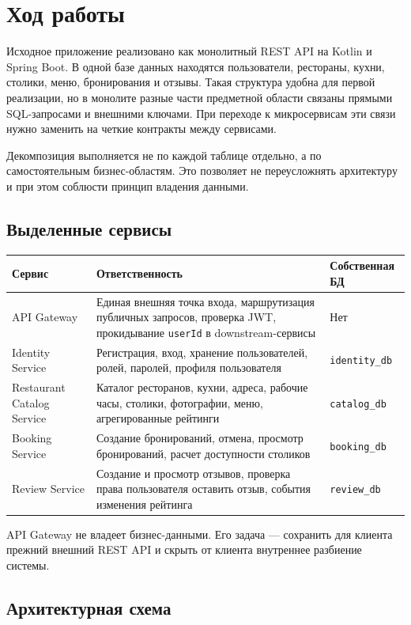 \documentclass[14pt,a4paper]{extarticle}
\newcommand{\code}[1]{\texttt{#1}}
\begin{document}
\section{Ход работы}

Исходное приложение реализовано как монолитный REST API на Kotlin и Spring Boot. В одной базе данных находятся пользователи, рестораны, кухни, столики, меню, бронирования и отзывы. Такая структура удобна для первой реализации, но в монолите разные части предметной области связаны прямыми SQL-запросами и внешними ключами. При переходе к микросервисам эти связи нужно заменить на четкие контракты между сервисами.

Декомпозиция выполняется не по каждой таблице отдельно, а по самостоятельным бизнес-областям. Это позволяет не переусложнять архитектуру и при этом соблюсти принцип владения данными.

\subsection{Выделенные сервисы}

\begin{longtable}{|L{0.23\textwidth}|L{0.47\textwidth}|L{0.18\textwidth}|}
\hline
\textbf{Сервис} & \textbf{Ответственность} & \textbf{Собственная БД} \\
\hline
API Gateway & Единая внешняя точка входа, маршрутизация публичных запросов, проверка JWT, прокидывание \code{userId} в downstream-сервисы & Нет \\
\hline
Identity Service & Регистрация, вход, хранение пользователей, ролей, паролей, профиля пользователя & \code{identity\_db} \\
\hline
Restaurant Catalog Service & Каталог ресторанов, кухни, адреса, рабочие часы, столики, фотографии, меню, агрегированные рейтинги & \code{catalog\_db} \\
\hline
Booking Service & Создание бронирований, отмена, просмотр бронирований, расчет доступности столиков & \code{booking\_db} \\
\hline
Review Service & Создание и просмотр отзывов, проверка права пользователя оставить отзыв, события изменения рейтинга & \code{review\_db} \\
\hline
\end{longtable}

API Gateway не владеет бизнес-данными. Его задача --- сохранить для клиента прежний внешний REST API и скрыть от клиента внутреннее разбиение системы.

\subsection{Архитектурная схема}
\end{document}
